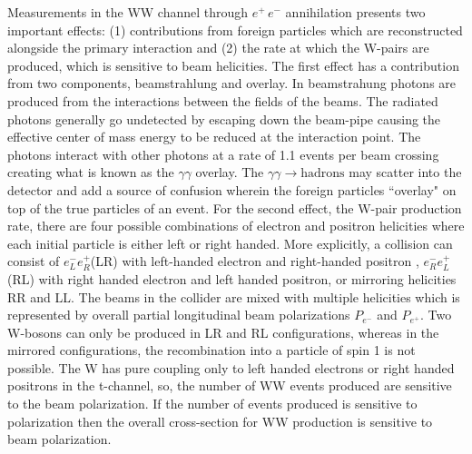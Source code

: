   
   






  
  Measurements in the WW channel through  $e^+ \, e^-$ annihilation presents two important effects: (1) contributions from foreign particles which are reconstructed alongside the primary interaction and (2) the rate at which the W-pairs are produced, which is sensitive to beam helicities. The first effect has a contribution from two components, beamstrahlung and overlay. In beamstrahung photons are produced from the interactions between the fields of the beams. The radiated photons generally go undetected by escaping down the beam-pipe causing the effective center of mass energy to be reduced at the interaction point. The photons interact with other photons at a rate of 1.1 events per beam crossing \cite{ILDIDR} creating what is known as the $\gamma \gamma$ overlay. The $\gamma \gamma \rightarrow \text{hadrons}$ may scatter into the detector and add a source of confusion wherein the foreign particles ``overlay" on top of the true particles of an event. For the second effect, the W-pair production rate, there are four possible combinations of electron and positron helicities where each initial particle is either left or right handed. More explicitly, a collision can consist of  $e^-_L e^+_R$(LR) with left-handed electron and right-handed positron , $e^-_R e^+_L$(RL)  with right handed electron and left handed positron, or mirroring helicities RR and LL.  The beams in the collider are mixed with multiple helicities which is represented by overall partial longitudinal beam polarizations $P_{e^-}$ and $ P_{e^+}$.  Two W-bosons can only be produced in LR and RL configurations, whereas in the mirrored configurations, the recombination into a particle of spin 1 is  not possible.  The W has pure coupling only to left handed electrons or right handed positrons in the t-channel, so, the number of  WW events produced are sensitive to the beam polarization\cite{thomson}.  If the number of events produced is sensitive to polarization then the overall cross-section for WW production is sensitive to beam polarization. 











